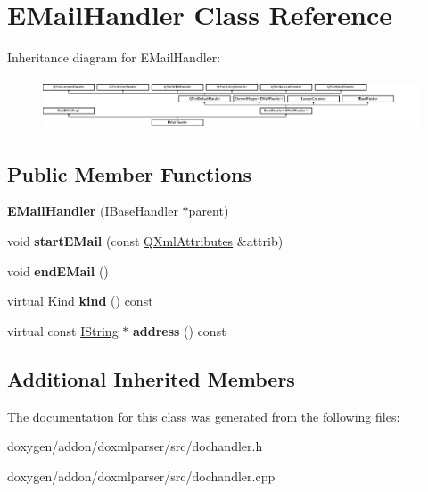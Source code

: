 \hypertarget{class_e_mail_handler}{}\section{E\+Mail\+Handler Class Reference}
\label{class_e_mail_handler}
Inheritance diagram for E\+Mail\+Handler\+:\begin{figure}[H]
\begin{center}
\leavevmode
\includegraphics[height=1.531100cm]{class_e_mail_handler}
\end{center}
\end{figure}
\subsection*{Public Member Functions}
\begin{DoxyCompactItemize}
\item 
\mbox{\label{class_e_mail_handler_a379fc24770548b9862312d90954e75c1}} 
{\bfseries E\+Mail\+Handler} (\mbox{\hyperlink{class_i_base_handler}{I\+Base\+Handler}} $\ast$parent)
\item 
\mbox{\label{class_e_mail_handler_a2c292391ba5f7023ca68233bd8f91f5e}} 
void {\bfseries start\+E\+Mail} (const \mbox{\hyperlink{class_q_xml_attributes}{Q\+Xml\+Attributes}} \&attrib)
\item 
\mbox{\label{class_e_mail_handler_a4d782426c632539133c60abb595f8921}} 
void {\bfseries end\+E\+Mail} ()
\item 
\mbox{\label{class_e_mail_handler_a26e8c879c73ed7eee83e41083cfeec7c}} 
virtual Kind {\bfseries kind} () const
\item 
\mbox{\label{class_e_mail_handler_aa582f2b098d5b24f19b6f4068cbd9fa7}} 
virtual const \mbox{\hyperlink{class_i_string}{I\+String}} $\ast$ {\bfseries address} () const
\end{DoxyCompactItemize}
\subsection*{Additional Inherited Members}


The documentation for this class was generated from the following files\+:\begin{DoxyCompactItemize}
\item 
doxygen/addon/doxmlparser/src/dochandler.\+h\item 
doxygen/addon/doxmlparser/src/dochandler.\+cpp\end{DoxyCompactItemize}
